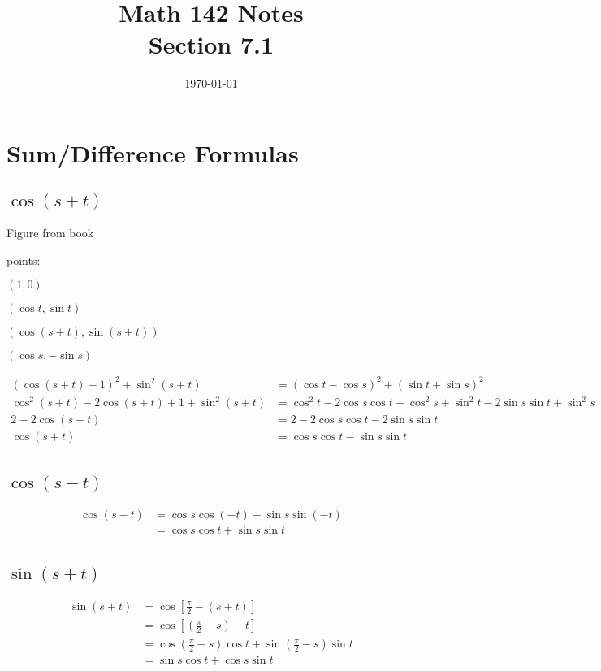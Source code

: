 \documentclass{exam}
\title{Math 142 Notes \\ Section 7.1}
\date{\today}
\begin{document}
  \maketitle
  \tableofcontents

  \section{Sum/Difference Formulas}

  \subsection{$\cos(s + t)$}
  Figure from book

  points:
  \begin{itemize*}
    \item $(1, 0)$
    \item $(\cos t, \sin t)$
    \item $(\cos (s + t), \sin (s + t))$
    \item $(\cos s, - \sin s)$
  \end{itemize*}

  \begin{align*}
    (\cos(s + t) - 1)^2 + \sin^2(s + t)               & = (\cos t - \cos s)^2 + (\sin t + \sin s)^2 \\
    \cos^2(s + t) - 2 \cos(s + t) + 1 + \sin^2(s + t) & = \cos^2 t - 2 \cos s \cos t + \cos^2 s + \sin^2 t - 2 \sin s \sin t + \sin^2 s \\
    2 - 2 \cos(s + t)                                 & = 2 - 2 \cos s \cos t - 2 \sin s \sin t \\
    \cos(s + t)                                       & = \cos s \cos t - \sin s \sin t \\
  \end{align*}

  \subsection{$\cos(s - t)$}
  \begin{align*}
    \cos(s - t) & = \cos s \cos (-t) - \sin s \sin (-t) \\
                & = \cos s \cos t + \sin s \sin t \\
  \end{align*}

  \subsection{$\sin(s + t)$}
  \begin{align*}
    \sin(s + t) & = \cos \left[ \frac{\pi}{2} - (s + t) \right] \\
                & = \cos \left[ \left(\frac{\pi}{2} - s \right) - t \right] \\
                & = \cos \left( \frac{\pi}{2} - s \right) \cos t + \sin \left( \frac{\pi}{2} - s \right) \sin t \\
                & = \sin s \cos t + \cos s \sin t \\
  \end{align*}
\end{document}
